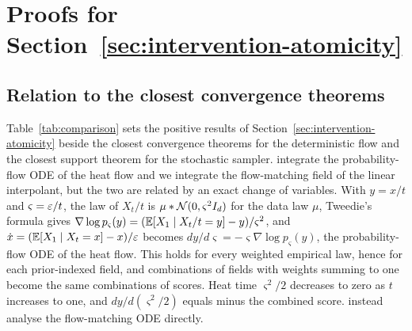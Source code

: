 \documentclass{article} %
\theoremstyle{plain}
\theoremstyle{definition}
\theoremstyle{remark}
\begin{document}
\section{Proofs for Section~\ref{sec:intervention-atomicity}}
\label{app:intervention-proofs}

\subsection{Relation to the closest convergence theorems}
\label{apx:comparison}

Table~\ref{tab:comparison} sets the positive results of Section~\ref{sec:intervention-atomicity}
beside the closest convergence theorems for the deterministic flow and the closest support theorem
for the stochastic sampler. \citet{liu2025pde,liu2026geometric} integrate the
probability-flow ODE of the heat flow and we integrate the flow-matching field of the linear
interpolant, but the two are related by an exact change of variables. With $y=x/t$ and
$\varsigma=\varepsilon/t$, the law of $X_t/t$ is $\mu*\mathcal{N}(0,\varsigma^2I_d)$ for the data law $\mu$,
Tweedie's formula gives $\nabla\log p_\varsigma(y)=(\mathbb{E}[X_1\mid X_t/t=y]-y)/\varsigma^2$, and
$\dot x=(\mathbb{E}[X_1\mid X_t=x]-x)/\varepsilon$ becomes $dy/d\varsigma=-\varsigma\nabla\log p_\varsigma(y)$,
the probability-flow ODE of the heat flow. This holds for every weighted empirical law, hence for each
prior-indexed field, and combinations of fields with weights summing to one become the same
combinations of scores. Heat time $\varsigma^2/2$ decreases to zero as $t$ increases to one,
and $dy/d(\varsigma^2/2)$ equals minus the combined score. \citet{wan2025elucidating} instead analyse the
flow-matching ODE directly.
\end{document}
